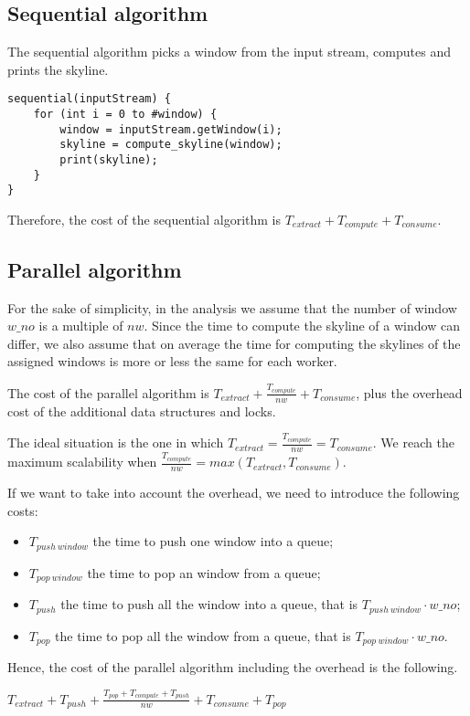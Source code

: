 \subsection{Sequential algorithm}
The sequential algorithm picks a window from the input stream, computes and prints the skyline.

\begin{verbatim}
sequential(inputStream) {
    for (int i = 0 to #window) {
        window = inputStream.getWindow(i);
        skyline = compute_skyline(window);
        print(skyline);
    }
}
\end{verbatim}

\noindent
Therefore, the cost of the sequential algorithm is $T_{extract} +  T_{compute} + T_{consume}$.


\subsection{Parallel algorithm}
For the sake of simplicity, in the analysis we assume that the number of window $w\_no$ is a multiple of $nw$. Since the time to compute the skyline of a window can differ, we also assume that on average the time for computing the skylines of the assigned windows is more or less the same for each worker.

\bigskip\noindent
The cost of the parallel algorithm is $T_{extract} +  \frac{T_{compute}}{nw} + T_{consume}$, plus the overhead cost of the additional data structures and locks.

\bigskip\noindent
The ideal situation is the one in which $T_{extract} = \frac{T_{compute}}{nw} = T_{consume}$.
We reach the maximum scalability when $\frac{T_{compute}}{nw} = max(T_{extract}, T_{consume})$.

\bigskip\noindent
If we want to take into account the overhead, we need to introduce the following costs:
\begin{itemize}
    \item $T_{push\ window}$ the time to push one window into a queue;
    \item $T_{pop\ window}$ the time to pop an window from a queue;
    \item $T_{push}$ the time to push all the window into a queue, that is $T_{push\ window} \cdot w\_no$;
    \item $T_{pop}$ the time to pop all the window from a queue, that is $T_{pop\ window} \cdot w\_no$.
\end{itemize}

\noindent
Hence, the cost of the parallel algorithm including the overhead is the following.
\begin{center}
    $T_{extract} + T_{push} +
    \frac{T_{pop} + T_{compute} + T_{push}}{nw} +
    T_{consume} + T_{pop}$
\end{center}

